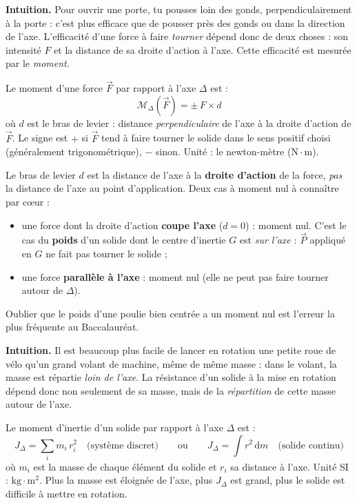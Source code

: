 \documentclass[11pt]{article}
\newcommand{\cle}[1]{{\popxbold\color{popdark}#1}}
\newcounter{popsec}
\newcounter{popsub}
\newcommand{\courssub}[1]{%
  \stepcounter{popsub}%
  \par\vspace{9pt}\noindent{\popxbold\fontsize{11.5}{13}\selectfont\color{popink}{\color{poporange}\thepopsec.\thepopsub}\hspace{6pt}#1}\par\nopagebreak\vspace{4pt}
}
\begin{document}
\textbf{Intuition.} Pour ouvrir une porte, tu pousses loin des gonds, perpendiculairement à la porte : c'est plus efficace que de pousser près des gonds ou dans la direction de l'axe. L'efficacité d'une force à faire \emph{tourner} dépend donc de deux choses : son intensité $F$ et la distance de sa droite d'action à l'axe. Cette efficacité est mesurée par le \emph{moment}.

\begin{definition}
Le \cle{moment} d'une force $\vec{F}$ par rapport à l'axe $\Delta$ est :
\[ \mathcal{M}_\Delta(\vec{F}) = \pm\, F \times d \]
où $d$ est le \cle{bras de levier} : distance \emph{perpendiculaire} de l'axe à la droite d'action de $\vec{F}$. Le signe est $+$ si $\vec{F}$ tend à faire tourner le solide dans le sens positif choisi (généralement trigonométrique), $-$ sinon. Unité : le newton-mètre ($\mathrm{N\cdot m}$).
\end{definition}

\begin{attention}
Le bras de levier $d$ est la distance de l'axe à la \textbf{droite d'action} de la force, \emph{pas} la distance de l'axe au point d'application. Deux cas à moment nul à connaître par c\oe ur :
\begin{itemize}
\item une force dont la droite d'action \textbf{coupe l'axe} ($d = 0$) : moment nul. C'est le cas du \textbf{poids} d'un solide dont le centre d'inertie $G$ est \emph{sur l'axe} : $\vec{P}$ appliqué en $G$ ne fait pas tourner le solide ;
\item une force \textbf{parallèle à l'axe} : moment nul (elle ne peut pas faire tourner autour de $\Delta$).
\end{itemize}
Oublier que le poids d'une poulie bien centrée a un moment nul est l'erreur la plus fréquente au Baccalauréat.
\end{attention}

\courssub{Moment d'inertie : l'inertie de rotation}

\textbf{Intuition.} Il est beaucoup plus facile de lancer en rotation une petite roue de vélo qu'un grand volant de machine, même de même masse : dans le volant, la masse est répartie \emph{loin de l'axe}. La résistance d'un solide à la mise en rotation dépend donc non seulement de sa masse, mais de la \emph{répartition} de cette masse autour de l'axe.

\begin{definition}
Le \cle{moment d'inertie} d'un solide par rapport à l'axe $\Delta$ est :
\[ J_\Delta = \sum_i m_i\, r_i^2 \quad \text{(système discret)} \qquad \text{ou} \qquad J_\Delta = \int r^2\,\mathrm{d}m \quad \text{(solide continu)} \]
où $m_i$ est la masse de chaque élément du solide et $r_i$ sa distance à l'axe. Unité SI : $\mathrm{kg\cdot m^2}$. Plus la masse est éloignée de l'axe, plus $J_\Delta$ est grand, plus le solide est difficile à mettre en rotation.
\end{definition}
\end{document}
